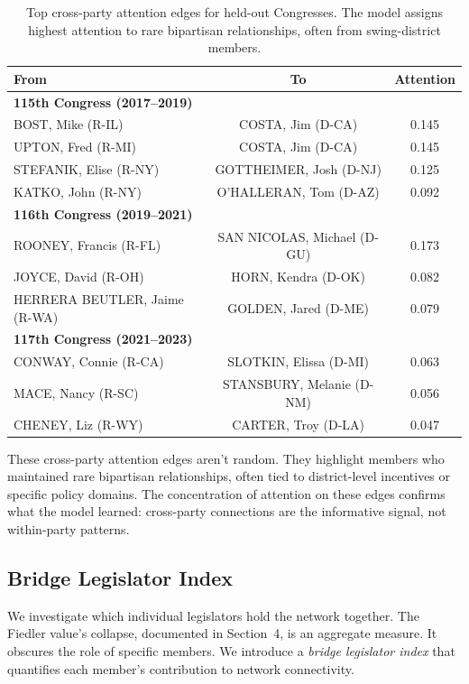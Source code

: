 \documentclass[12pt, a4paper]{article}
\begin{document}
\begin{table}[H]
\centering
{\footnotesize
\caption{Top cross-party attention edges for held-out Congresses. The model assigns highest attention to rare bipartisan relationships, often from swing-district members.}
\label{tab:cross_edges}
\begin{tabular}{lcc}
\toprule
From & To & Attention \\
\midrule
\midrule
\multicolumn{3}{l}{\textbf{115th Congress (2017--2019)}} \\
BOST, Mike (R-IL) & COSTA, Jim (D-CA) & 0.145 \\
UPTON, Fred (R-MI) & COSTA, Jim (D-CA) & 0.145 \\
STEFANIK, Elise (R-NY) & GOTTHEIMER, Josh (D-NJ) & 0.125 \\
KATKO, John (R-NY) & O'HALLERAN, Tom (D-AZ) & 0.092 \\
\midrule
\multicolumn{3}{l}{\textbf{116th Congress (2019--2021)}} \\
ROONEY, Francis (R-FL) & SAN NICOLAS, Michael (D-GU) & 0.173 \\
JOYCE, David (R-OH) & HORN, Kendra (D-OK) & 0.082 \\
HERRERA BEUTLER, Jaime (R-WA) & GOLDEN, Jared (D-ME) & 0.079 \\
\midrule
\multicolumn{3}{l}{\textbf{117th Congress (2021--2023)}} \\
CONWAY, Connie (R-CA) & SLOTKIN, Elissa (D-MI) & 0.063 \\
MACE, Nancy (R-SC) & STANSBURY, Melanie (D-NM) & 0.056 \\
CHENEY, Liz (R-WY) & CARTER, Troy (D-LA) & 0.047 \\
\bottomrule
\end{tabular}
}
\end{table}

These cross-party attention edges aren't random. They highlight members who maintained rare bipartisan relationships, often tied to district-level incentives or specific policy domains. The concentration of attention on these edges confirms what the model learned: cross-party connections are the informative signal, not within-party patterns.

\subsection{Bridge Legislator Index}

We investigate which individual legislators hold the network together. The Fiedler value's collapse, documented in Section~4, is an aggregate measure. It obscures the role of specific members. We introduce a \textit{bridge legislator index} that quantifies each member's contribution to network connectivity.
\end{document}
